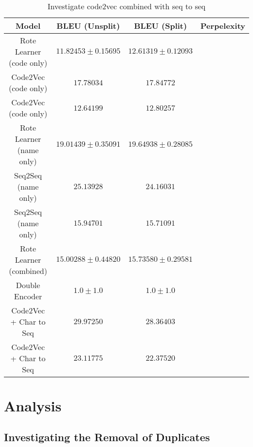 \begin{table}[h!]
\begin{center}
\begin{tabular}{ c | c | c | c }
    Model                             & BLEU (Unsplit)  & BLEU (Split)    & Perpelexity \\
    \hline
    Rote Learner  (code only)         & $ 11.82453 \pm  0.15695 $ & $ 12.61319 \pm 0.12093 $ & \\
    Code2Vec  (code only)             & $ 17.78034 $ & $ 17.84772 $ & \\
    \hdashline
    Code2Vec  (code only)             & $ 12.64199 $ & $ 12.80257 $ & \\
    \hline
    \hline
    Rote Learner  (name only)         & $ 19.01439 \pm  0.35091 $ & $ 19.64938 \pm 0.28085 $ & \\
    Seq2Seq  (name only)              & $ 25.13928 $ & $ 24.16031 $ & \\
    \hdashline
    Seq2Seq  (name only)              & $ 15.94701 $ & $ 15.71091 $ & \\
    \hline
    \hline
    Rote Learner (combined)            & $ 15.00288 \pm  0.44820 $ & $ 15.73580 \pm 0.29581 $ & \\
    Double Encoder                    & $1.0 \pm 1.0 $  & $1.0 \pm 1.0 $  &  \\
    Code2Vec  + Char to Seq           & $ 29.97250 $ & $ 28.36403 $ & \\
    \hdashline
    Code2Vec  + Char to Seq           & $ 23.11775 $ & $ 22.37520 $ & \\
    \hline
\end{tabular}
\caption {Investigate code2vec combined with seq to seq}
\label{table:code2vec_embed}
\end{center}
\end{table}





\section{Analysis} %
\label{sec:analysis}


\subsection{Investigating the Removal of Duplicates} %
\label{sub:investigating_the_removal_of_duplicates}

